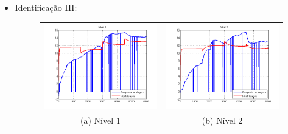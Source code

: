 \begin{itemize}
\newpage \item Identificação III:
\begin{figure}[H]
	\centering
	\begin{tabular}{cc}
		\includegraphics[height=0.15\paperheight,keepaspectratio]{img/ident3_h1.png} &
		\includegraphics[height=0.15\paperheight,keepaspectratio]{img/ident3_h2.png} \\
		(a) Nível 1 &
		(b) Nível 2 \\

\end{tabular}
\end{figure}
\end{itemize}
